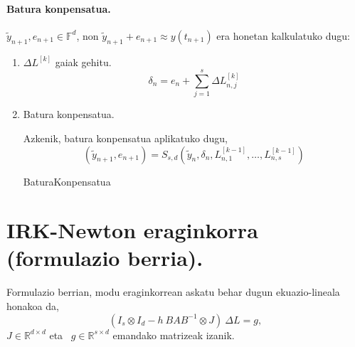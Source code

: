\paragraph*{Batura konpensatua.}

$\tilde{y}_{n+1}, e_{n+1} \in \mathbb{F}^d$, non $\tilde{y}_{n+1}+e_{n+1}\approx y(t_{n+1})$ era honetan kalkulatuko dugu:

\begin{enumerate}

\item $\Delta L^{[k]}$ gaiak gehitu.
\begin{equation*}
\delta_{n}={e}_{n} + \sum\limits_{j=1}^{s}\Delta L_{n,j}^{[k]}
\end{equation*}

\item Batura konpensatua.

Azkenik, batura konpensatua aplikatuko dugu,
\begin{equation}
\label{eq:bkLi2}
(\tilde y_{n+1}, e_{n+1}) = S_{s,d}(\tilde y_n, \delta_n, L_{n,1}^{[k-1]}, \dots,L_{n,s}^{[k-1]})
\end{equation}
 
\begin{algorithm}[H]
  \SetAlgoLined\DontPrintSemicolon
  \caption{BaturaKonpensatua}
\end{algorithm} 

\end{enumerate}

\section{IRK-Newton eraginkorra (formulazio berria).}


Formulazio berrian, modu eraginkorrean askatu behar dugun ekuazio-lineala honakoa da, 
\begin{equation}
\label{eq:linsysZG}
(I_s \otimes I_d - h \ BAB^{-1} \otimes J) \ \Delta L = g, 
\end{equation}
$J \in \mathbb{R}^{d \times d}$  eta ~$g \in \mathbb{R}^{s \times d}$ emandako matrizeak izanik. 

